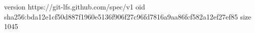 version https://git-lfs.github.com/spec/v1
oid sha256:bda12e1cf50d887f1960e5136f906f27c96fd7816a9aa86fcf582a12ef27ef85
size 1045
